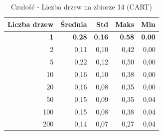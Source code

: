 \begin{table}[htbp]
\centering
\small
\setlength{\tabcolsep}{6pt}
\renewcommand{\arraystretch}{1.2}
\caption{Czułość - Liczba drzew na zbiorze 14 (CART)}
\label{tab:CART_tree_count_14_recall}
\begin{tabular}{r|r|r|r|r}
\toprule
Liczba drzew & Średnia & Std & Maks & Min \\
\hline
\textbf{1} & \textbf{0.28} & \textbf{0.16} & \textbf{0.58} & \textbf{0.00} \\
2 & 0,11 & 0,10 & 0,42 & 0,00 \\
5 & 0,22 & 0,12 & 0,50 & 0,00 \\
10 & 0,16 & 0,10 & 0,38 & 0,00 \\
20 & 0,16 & 0,08 & 0,35 & 0,00 \\
50 & 0,15 & 0,09 & 0,35 & 0,04 \\
100 & 0,15 & 0,08 & 0,38 & 0,04 \\
200 & 0,14 & 0,07 & 0,27 & 0,04 \\
\bottomrule
\end{tabular}
\end{table}